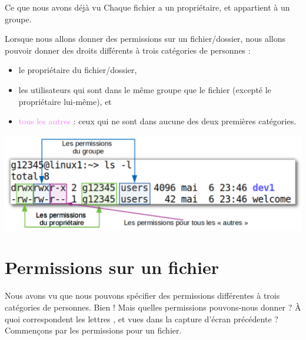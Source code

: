 \documentclass[a4paper,11pt]{style-esi/td}
\begin{document}
		\begin{infotbox}{Ce que nous avons déjà vu}
			Chaque fichier a un propriétaire, et appartient à un groupe.
		\end{infotbox}

		
		Lorsque nous allons donner des permissions sur un fichier/dossier,
		nous allons pouvoir donner des droits différents à trois catégories
		de personnes :
                \begin{itemize}
                \item le \textcolor{green!50!black}{propriétaire} du fichier/dossier,
                \item les \textcolor{blue!50!black}{utilisateurs qui sont dans le même groupe} que le fichier (excepté le propriétaire lui-même), et
                \item \textcolor{violet}{tous les autres} : ceux qui ne sont dans aucune des deux premières catégories.
              \end{itemize}


		\begin{center}
			\includegraphics[width=.8\textwidth]{image/categorie}
		\end{center}

    \section{Permissions sur un fichier}  

		Nous avons vu que nous pouvons spécifier des permissions différentes
		à trois catégories de personnes.
		Bien ! Mais quelles permissions pouvons-nous donner ?
		À quoi correspondent les lettres ,  et 
		vues dans la capture d'écran précédente ?
		Commençons par les permissions pour un fichier.
\end{document}
